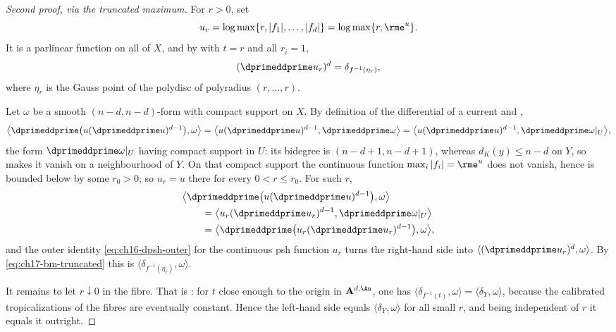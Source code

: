 \begin{proof}[Second proof, via the truncated maximum]
For $r>0$, set
\[
 u_r=\log\max\{r,|f_1|,\dots,|f_d|\}
     =\log\max\{r,\rme^{u}\}.
\]
It is a parlinear function on all of $X$, and by
 with $t=r$ and all $r_i=1$,
\begin{equation}
\label{eq:ch17-bm-truncated}
 (\dprimeddprime u_r)^d=\delta_{f^{-1}(\eta_{r})},
\end{equation}
where $\eta_r$ is the Gauss point of the polydisc of polyradius
$(r,\dots,r)$.

Let $\omega$ be a smooth $(n-d,n-d)$-form with compact support on $X$.
By definition of the differential of a current and
,
\[
 \bigl\langle\dprimeddprime\bigl(u(\dprimeddprime u)^{d-1}\bigr),\omega\bigr\rangle
 =\bigl\langle u(\dprimeddprime u)^{d-1},\dprimeddprime\omega\bigr\rangle
 =\bigl\langle u(\dprimeddprime u)^{d-1},\dprimeddprime\omega|_U\bigr\rangle,
\]
the form $\dprimeddprime\omega|_U$ having compact support in $U$: its
bidegree is $(n-d+1,n-d+1)$, whereas $d_K(y)\le n-d$ on $Y$,
so  makes it vanish on a
neighbourhood of $Y$.  On that compact support the continuous function
$\max_i|f_i|=\rme^{u}$ does not vanish, hence is bounded below by some
$r_0>0$; so $u_r=u$ there for every $0<r\le r_0$.  For such $r$,
\[
 \begin{aligned}
  &\bigl\langle\dprimeddprime
    \bigl(u(\dprimeddprime u)^{d-1}\bigr),\omega\bigr\rangle\\
  &\qquad=\bigl\langle u_r(\dprimeddprime u_r)^{d-1},
    \dprimeddprime\omega|_U\bigr\rangle\\
  &\qquad=\bigl\langle\dprimeddprime
    \bigl(u_r(\dprimeddprime u_r)^{d-1}\bigr),\omega\bigr\rangle,
 \end{aligned}
\]
and the outer identity \eqref{eq:ch16-dpsh-outer} for the continuous psh
function $u_r$ turns the right-hand side into
$\langle(\dprimeddprime u_r)^d,\omega\rangle$.  By
\eqref{eq:ch17-bm-truncated} this is $\langle\delta_{f^{-1}(\eta_r)},\omega\rangle$.

It remains to let $r\downarrow0$ in the fibre.  That is
: for $t$ close enough to the origin
in $\mathbf A^{d,\An}$, one has
$\langle\delta_{f^{-1}(t)},\omega\rangle=\langle\delta_Y,\omega\rangle$,
because the calibrated tropicalizations of the fibres are eventually
constant.  Hence the left-hand side equals $\langle\delta_Y,\omega\rangle$
for all small $r$, and being independent of $r$ it equals it outright.
\end{proof}


